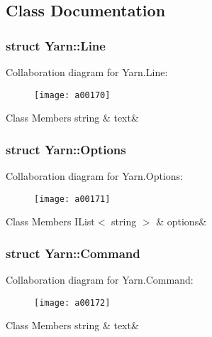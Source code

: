 \subsection{Class Documentation}
\label{a00159}
\hypertarget{a00026_a00159}{}
\subsubsection{struct Yarn\-:\-:Line}


Collaboration diagram for Yarn.\-Line\-:
\nopagebreak
\begin{figure}[H]
\begin{center}
\leavevmode
\texttt{[image: a00170]}
\end{center}
\end{figure}
\begin{DoxyFields}{Class Members}
\hypertarget{a00026_a81d1f04bbb4cf6642d2bd685bda1da20}{string}\label{a00026_a81d1f04bbb4cf6642d2bd685bda1da20}
&
text&
\\
\hline

\end{DoxyFields}
\label{a00161}
\hypertarget{a00026_a00161}{}
\subsubsection{struct Yarn\-:\-:Options}


Collaboration diagram for Yarn.\-Options\-:
\nopagebreak
\begin{figure}[H]
\begin{center}
\leavevmode
\texttt{[image: a00171]}
\end{center}
\end{figure}
\begin{DoxyFields}{Class Members}
\hypertarget{a00026_ae8c616d923ceeeed192a9436c55d9917}{I\-List$<$ string $>$}\label{a00026_ae8c616d923ceeeed192a9436c55d9917}
&
options&
\\
\hline

\end{DoxyFields}
\label{a00156}
\hypertarget{a00026_a00156}{}
\subsubsection{struct Yarn\-:\-:Command}


Collaboration diagram for Yarn.\-Command\-:
\nopagebreak
\begin{figure}[H]
\begin{center}
\leavevmode
\texttt{[image: a00172]}
\end{center}
\end{figure}
\begin{DoxyFields}{Class Members}
\hypertarget{a00026_a8564e5104566e145f5d917ec846444d9}{string}\label{a00026_a8564e5104566e145f5d917ec846444d9}
&
text&
\\
\hline

\end{DoxyFields}
